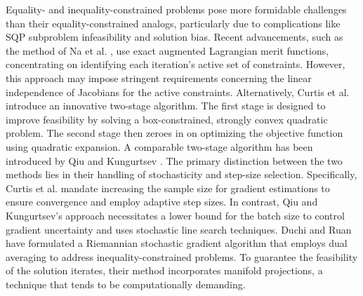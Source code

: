 \documentclass[aos]{imsart}
\numberwithin{equation}{section}
\theoremstyle{plain}
\begin{document}
Equality- and inequality-constrained problems pose more formidable challenges than their equality-constrained analogs, particularly due to complications like SQP subproblem infeasibility and solution bias. 
Recent advancements, such as the method of Na et al. \cite{na2023adaptive}, use exact augmented Lagrangian merit functions, concentrating on identifying each iteration's active set of constraints. However, this approach may impose stringent requirements concerning the linear independence of Jacobians for the active constraints.
Alternatively, Curtis et al. \cite{curtis2023sequential} introduce an innovative two-stage algorithm. 
The first stage is designed to improve feasibility by solving a box-constrained, strongly convex quadratic problem. 
The second stage then zeroes in on optimizing the objective function using quadratic expansion. 
A comparable two-stage algorithm has been introduced by Qiu and Kungurtsev \cite{qiu2023sequential}.
The primary distinction between the two methods lies in their handling of stochasticity and step-size selection. 
Specifically, Curtis et al. mandate increasing the sample size for gradient estimations to ensure convergence and employ adaptive step sizes. 
In contrast, Qiu and Kungurtsev's approach \cite{qiu2023sequential} necessitates a lower bound for the batch size to control gradient uncertainty and uses stochastic line search techniques.
Duchi and Ruan \cite{duchi2021asymptotic} have formulated a Riemannian stochastic gradient algorithm that employs dual averaging to address inequality-constrained problems. 
To guarantee the feasibility of the solution iterates, their method incorporates manifold projections, a technique that tends to be computationally demanding.
\end{document}

